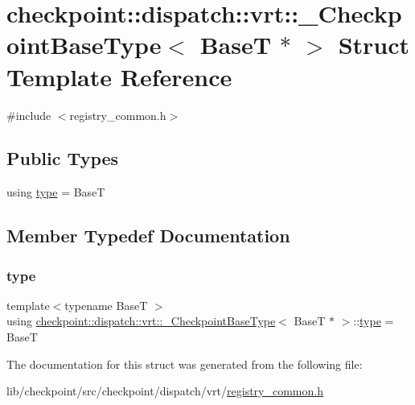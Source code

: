 \hypertarget{structcheckpoint_1_1dispatch_1_1vrt_1_1___checkpoint_base_type_3_01_base_t_01_5_01_4}{}\section{checkpoint\+:\+:dispatch\+:\+:vrt\+:\+:\+\_\+\+Checkpoint\+Base\+Type$<$ BaseT $\ast$ $>$ Struct Template Reference}
\label{structcheckpoint_1_1dispatch_1_1vrt_1_1___checkpoint_base_type_3_01_base_t_01_5_01_4}


{\ttfamily \#include $<$registry\+\_\+common.\+h$>$}

\subsection*{Public Types}
\begin{DoxyCompactItemize}
\item 
using \hyperlink{structcheckpoint_1_1dispatch_1_1vrt_1_1___checkpoint_base_type_3_01_base_t_01_5_01_4_aca391d3ce3aa89a2c597167ea0e6dd5d}{type} = BaseT
\end{DoxyCompactItemize}


\subsection{Member Typedef Documentation}
\mbox{\label{structcheckpoint_1_1dispatch_1_1vrt_1_1___checkpoint_base_type_3_01_base_t_01_5_01_4_aca391d3ce3aa89a2c597167ea0e6dd5d}} 
\subsubsection{\texorpdfstring{type}{type}}
{\footnotesize\ttfamily template$<$typename BaseT $>$ \\
using \hyperlink{structcheckpoint_1_1dispatch_1_1vrt_1_1___checkpoint_base_type}{checkpoint\+::dispatch\+::vrt\+::\+\_\+\+Checkpoint\+Base\+Type}$<$ BaseT $\ast$ $>$\+::\hyperlink{structcheckpoint_1_1dispatch_1_1vrt_1_1___checkpoint_base_type_3_01_base_t_01_5_01_4_aca391d3ce3aa89a2c597167ea0e6dd5d}{type} =  BaseT}



The documentation for this struct was generated from the following file\+:\begin{DoxyCompactItemize}
\item 
lib/checkpoint/src/checkpoint/dispatch/vrt/\hyperlink{registry__common_8h}{registry\+\_\+common.\+h}\end{DoxyCompactItemize}
